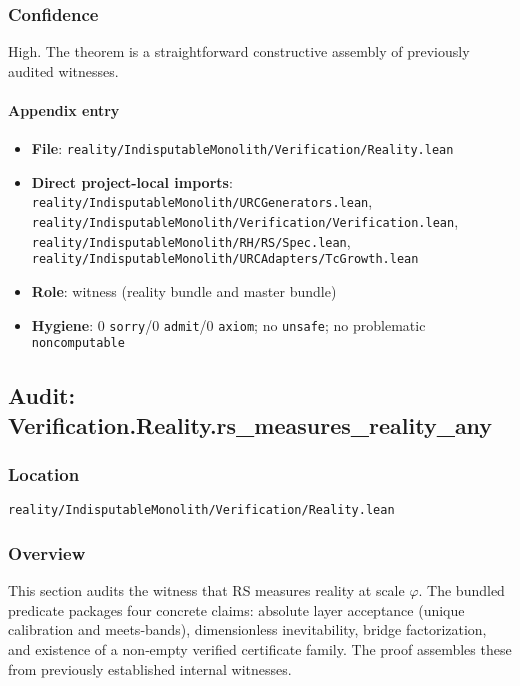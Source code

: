 \documentclass{article}
\newcommand{\FileRef}[1]{\texttt{#1}}
\begin{document}
\subsubsection{Confidence}
High. The theorem is a straightforward constructive assembly of previously audited witnesses.

\paragraph{Appendix entry}
\begin{itemize}[leftmargin=*]
  \item \textbf{File}: \FileRef{reality/IndisputableMonolith/Verification/Reality.lean}
  \item \textbf{Direct project-local imports}: \FileRef{reality/IndisputableMonolith/URCGenerators.lean}, \FileRef{reality/IndisputableMonolith/Verification/Verification.lean}, \FileRef{reality/IndisputableMonolith/RH/RS/Spec.lean}, \FileRef{reality/IndisputableMonolith/URCAdapters/TcGrowth.lean}
  \item \textbf{Role}: witness (reality bundle and master bundle)
  \item \textbf{Hygiene}: 0 \texttt{sorry}/0 \texttt{admit}/0 \texttt{axiom}; no \texttt{unsafe}; no problematic \texttt{noncomputable}
\end{itemize}

\subsection{Audit: Verification.Reality.rs\_measures\_reality\_any}
\subsubsection{Location}
\FileRef{reality/IndisputableMonolith/Verification/Reality.lean}

\subsubsection{Overview}
This section audits the witness that RS measures reality at scale \(\varphi\). The bundled predicate packages four concrete claims: absolute layer acceptance (unique calibration and meets‑bands), dimensionless inevitability, bridge factorization, and existence of a non‑empty verified certificate family. The proof assembles these from previously established internal witnesses.
\end{document}
